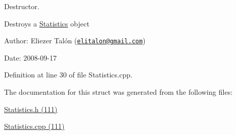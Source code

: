 Destructor. 

Destroys a \hyperlink{struct_statistics}{Statistics} object

\begin{Desc}
\item[Author:]Eliezer Talón (\href{mailto:elitalon@gmail.com}{\tt elitalon@gmail.com}) \end{Desc}
\begin{Desc}
\item[Date:]2008-09-17 \end{Desc}


Definition at line 30 of file Statistics.cpp.

The documentation for this struct was generated from the following files:\begin{CompactItemize}
\item 
\hyperlink{_statistics_8h}{Statistics.h (111)}\item 
\hyperlink{_statistics_8cpp}{Statistics.cpp (111)}\end{CompactItemize}
